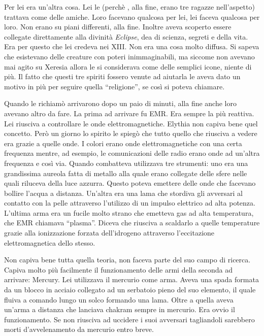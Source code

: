     Per lei era un'altra cosa. Lei le (perchè , alla fine, erano tre
    ragazze nell'aspetto) trattava come delle amiche. Loro facevano
    qualcosa per lei, lei faceva qualcosa per loro. Non erano su piani
    differenti, alla fine. Inoltre aveva scoperto essere collegate
    direttamente alla divinità \emph{Eclipse}, dea di scienza, segreti e
    della vita. Era per questo che lei credeva nei XIII. Non era
    una cosa molto diffusa. Si sapeva che esistevano delle creature con
    poteri inimmaginabili, ma siccome non avevano mai agito su Xeresia
    allora le si considerava come delle semplici icone, niente di più. Il
    fatto che questi tre spiriti fossero venute ad aiutarla le aveva dato
    un motivo in più per seguire quella ``religione'', se così si poteva
    chiamare.

    Quando le richiamò arrivarono dopo un paio di minuti, alla fine anche
    loro avevano altro da fare. La prima ad arrivare fu EMR. Era sempre la
    più reattiva. Lei riusciva a controllare le onde elettromagnetiche.
    Elythia non capiva bene quel concetto. Però un giorno lo spirito le
    spiegò che tutto quello che riusciva a vedere era grazie a quelle onde.
    I colori erano onde elettromagnetiche con una certa frequenza mentre,
    ad esempio, le comunicazioni delle radio erano onde ad un'altra
    frequenza e così via. Quando combatteva utilizzava tre strumenti: uno
    era una grandissima aureola fatta di metallo alla quale erano collegate
    delle sfere nelle quali riluceva della luce azzurra. Questo poteva
    emettere delle onde che facevano bollire l'acqua a distanza. Un'altra
    era una lama che stordiva gli avversari al contatto con la pelle
    attraverso l'utilizzo di un impulso elettrico ad alta potenza. L'ultima
    arma era un fucile molto strano che emetteva gas ad alta temperatura,
    che EMR chiamava ``plasma''. Diceva che riusciva a scaldarlo a quelle
    temperature grazie alla ionizzazione forzata dell'idrogeno attraverso
    l'eccitazione elettromagnetica dello stesso.

    Non capiva bene tutta quella teoria, non faceva parte del suo campo di
    ricerca. Capiva molto più facilmente il funzionamento delle armi della
    seconda ad arrivare: Mercury. Lei utilizzava il mercurio come arma.
    Aveva una spada formata da un blocco in acciaio collegato ad un
    serbatoio pieno del suo elemento, il quale fluiva a comando lungo un
    solco formando una lama. Oltre a quella aveva un'arma a distanza che
    lanciava chakram sempre in mercurio. Era ovvio il funzionamento. Se non
    riusciva ad uccidere i suoi avversari tagliandoli sarebbero morti
    d'avvelenamento da mercurio entro breve.

